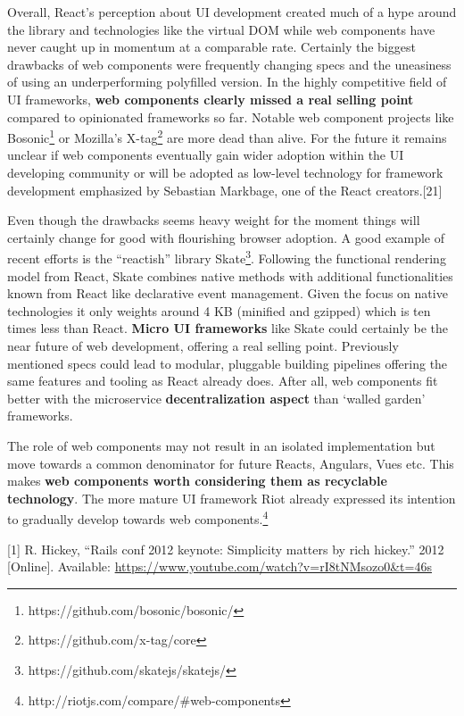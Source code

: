 \documentclass[]{article}
\begin{document}
Overall, React's perception about UI development created much of a hype
around the library and technologies like the virtual DOM while web
components have never caught up in momentum at a comparable rate.
Certainly the biggest drawbacks of web components were frequently
changing specs and the uneasiness of using an underperforming polyfilled
version. In the highly competitive field of UI frameworks, \textbf{web
components clearly missed a real selling point} compared to opinionated
frameworks so far. Notable web component projects like Bosonic\footnote{https://github.com/bosonic/bosonic/}
or Mozilla's X-tag\footnote{https://github.com/x-tag/core} are more dead
than alive. For the future it remains unclear if web components
eventually gain wider adoption within the UI developing community or
will be adopted as low-level technology for framework development
emphasized by Sebastian Markbage, one of the React creators.{[}21{]}

Even though the drawbacks seems heavy weight for the moment things will
certainly change for good with flourishing browser adoption. A good
example of recent efforts is the ``reactish'' library Skate\footnote{https://github.com/skatejs/skatejs/}.
Following the functional rendering model from React, Skate combines
native methods with additional functionalities known from React like
declarative event management. Given the focus on native technologies it
only weights around 4 KB (minified and gzipped) which is ten times less
than React. \textbf{Micro UI frameworks} like Skate could certainly be
the near future of web development, offering a real selling point.
Previously mentioned specs could lead to modular, pluggable building
pipelines offering the same features and tooling as React already does.
After all, web components fit better with the microservice
\textbf{decentralization aspect} than `walled garden' frameworks.

The role of web components may not result in an isolated implementation
but move towards a common denominator for future Reacts, Angulars, Vues
etc. This makes \textbf{web components worth considering them as
recyclable technology}. The more mature UI framework Riot already
expressed its intention to gradually develop towards web
components.\footnote{http://riotjs.com/compare/\#web-components}

\hypertarget{refs}{}
\hypertarget{ref-Hickey2012}{}
{[}1{]} R. Hickey, ``Rails conf 2012 keynote: Simplicity matters by rich
hickey.'' 2012 {[}Online{]}. Available:
\url{https://www.youtube.com/watch?v=rI8tNMsozo0\&t=46s}
\end{document}
